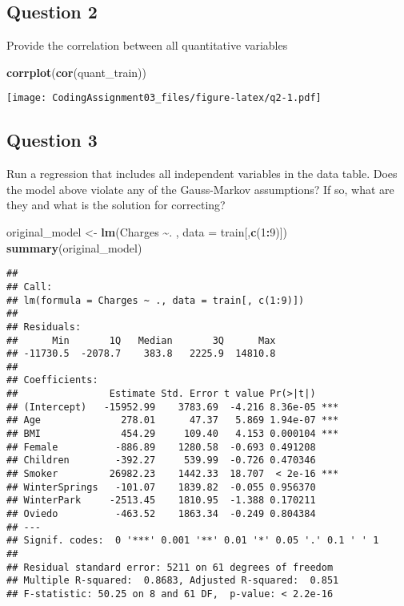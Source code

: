 \documentclass[
]{article}
\newenvironment{Shaded}{\begin{snugshade}}{\end{snugshade}}
\newcommand{\AttributeTok}[1]{\textcolor[rgb]{0.13,0.29,0.53}{#1}}
\newcommand{\DecValTok}[1]{\textcolor[rgb]{0.00,0.00,0.81}{#1}}
\newcommand{\FunctionTok}[1]{\textcolor[rgb]{0.13,0.29,0.53}{\textbf{#1}}}
\newcommand{\NormalTok}[1]{#1}
\newcommand{\OtherTok}[1]{\textcolor[rgb]{0.56,0.35,0.01}{#1}}
\newcommand{\SpecialCharTok}[1]{\textcolor[rgb]{0.81,0.36,0.00}{\textbf{#1}}}
\begin{document}
\subsection{Question 2}\label{question-2}

Provide the correlation between all quantitative variables

\begin{Shaded}
\begin{Highlighting}[]
\FunctionTok{corrplot}\NormalTok{(}\FunctionTok{cor}\NormalTok{(quant\_train))}
\end{Highlighting}
\end{Shaded}

\texttt{[image: CodingAssignment03\_files/figure-latex/q2-1.pdf]}

\subsection{Question 3}\label{question-3}

Run a regression that includes all independent variables in the data
table. Does the model above violate any of the Gauss-Markov assumptions?
If so, what are they and what is the solution for correcting?

\begin{Shaded}
\begin{Highlighting}[]
\NormalTok{original\_model }\OtherTok{\textless{}{-}} \FunctionTok{lm}\NormalTok{(Charges }\SpecialCharTok{\textasciitilde{}}\NormalTok{. , }\AttributeTok{data =}\NormalTok{ train[,}\FunctionTok{c}\NormalTok{(}\DecValTok{1}\SpecialCharTok{:}\DecValTok{9}\NormalTok{)])}
\FunctionTok{summary}\NormalTok{(original\_model)}
\end{Highlighting}
\end{Shaded}

\begin{verbatim}
## 
## Call:
## lm(formula = Charges ~ ., data = train[, c(1:9)])
## 
## Residuals:
##      Min       1Q   Median       3Q      Max 
## -11730.5  -2078.7    383.8   2225.9  14810.8 
## 
## Coefficients:
##                Estimate Std. Error t value Pr(>|t|)    
## (Intercept)   -15952.99    3783.69  -4.216 8.36e-05 ***
## Age              278.01      47.37   5.869 1.94e-07 ***
## BMI              454.29     109.40   4.153 0.000104 ***
## Female          -886.89    1280.58  -0.693 0.491208    
## Children        -392.27     539.99  -0.726 0.470346    
## Smoker         26982.23    1442.33  18.707  < 2e-16 ***
## WinterSprings   -101.07    1839.82  -0.055 0.956370    
## WinterPark     -2513.45    1810.95  -1.388 0.170211    
## Oviedo          -463.52    1863.34  -0.249 0.804384    
## ---
## Signif. codes:  0 '***' 0.001 '**' 0.01 '*' 0.05 '.' 0.1 ' ' 1
## 
## Residual standard error: 5211 on 61 degrees of freedom
## Multiple R-squared:  0.8683, Adjusted R-squared:  0.851 
## F-statistic: 50.25 on 8 and 61 DF,  p-value: < 2.2e-16
\end{verbatim}
\end{document}
